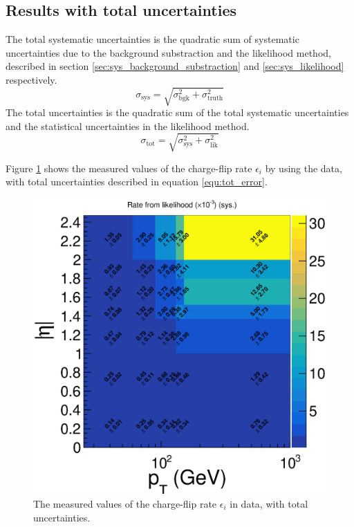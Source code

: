 \subsection{Results with total uncertainties}
\label{sec:charge_flip_results_stat}
The total systematic uncertainties is the quadratic sum of systematic uncertainties due to the background substraction and the likelihood method, described in section \ref{sec:sys_background_substraction} and \ref{sec:sys_likelihood} respectively.
\begin{equation}
\sigma_{\text{sys}} = \sqrt{\sigma_{\text{bgk}} ^2+ \sigma_{\text{truth}} ^2}
\end{equation}
The total uncertainties is the quadratic sum of the total systematic uncertainties and the statistical uncertainties in the likelihood method.
\begin{equation}
\sigma_{\text{tot}} = \sqrt{\sigma_{\text{sys}} ^2 + \sigma_{\text{lik}} ^2}
\label{equ:tot_error}
\end{equation}

Figure \ref{fig:charge_flip_data_tot} shows the measured values of the charge-flip rate $\epsilon_i$ by using the data, with total uncertainties described in equation \ref{equ:tot_error}.

\begin{figure}
\centering
\includegraphics[width=\textwidth]{data/plot/charge_flip/FitPlots/data_cf_rate_tot.eps}
\caption{The measured values of the charge-flip rate $\epsilon_i$ in data, with total uncertainties.}
\label{fig:charge_flip_data_tot}
\end{figure}

